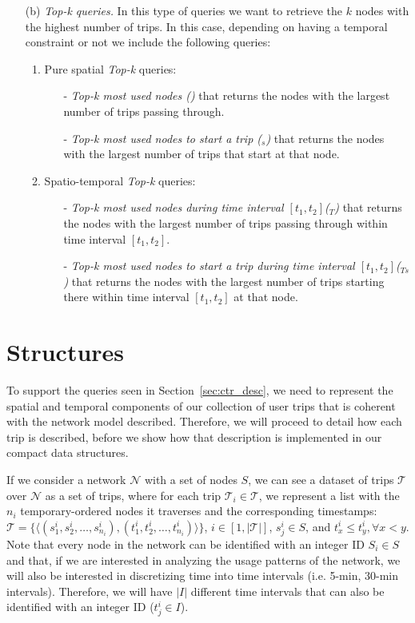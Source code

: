 \begin{itemize}
		\item[(b)] {\em Top-k queries.} In this type of queries we want to retrieve the $k$ nodes with the highest number of trips. In this case, depending on having a temporal constraint or not we include the following queries:
		\begin{enumerate}
			\item Pure spatial {\em Top-k} queries:
			\begin{itemize}
				\item[-] {\em Top-k most used nodes (\topK)} that returns the nodes with the largest number of trips passing through.
				\item[-] {\em Top-k most used nodes to start a trip (\topK$_s$)} that returns the nodes with the largest number of trips that start at that node.
			\end{itemize}
			
			\item Spatio-temporal {\em Top-k}  queries:
			\begin{itemize}
				\item[-] {\em Top-k most used nodes during time interval $[t_1,t_2]$(\topK$_T$)} that returns the nodes with the largest number of trips passing through within time interval $[t_1,t_2]$. 
				\item[-] {\em Top-k most used nodes to start a trip during time interval $[t_1,t_2]$(\topK$_{Ts}$)} that returns the nodes with the largest number of trips starting there within time interval $[t_1,t_2]$ at that node.
			\end{itemize}
		\end{enumerate}
	\end{itemize}

\section{Structures}
\label{sec:ctr_str}
	To support the queries seen in Section~\ref{sec:ctr_desc}, we need to represent the spatial and temporal components of our collection of user trips that is coherent with the network model described. Therefore, we will proceed to detail how each trip is described, before we show how that description is implemented in our compact data structures.

	If we consider a network $\mathcal{N}$ with a set of nodes $S$, 
	we can see a dataset of trips $\mathcal{T}$ over $\mathcal{N}$ as 
	a set of trips, where for each trip $\mathcal{T}_i \in \mathcal{T}$, we represent a list with the 
	$n_i$
	temporary-ordered nodes it traverses and the corresponding timestamps: 
	$\mathcal{T}= \{ \langle (s^i_1, s^i_2, \dots,  s^i_{n_i}),(t^i_1, t^i_2, \dots,  t^i_{n_i}) \rangle\}$, $i\in[1,|\mathcal{T}|]$, 
	$s^i_j \in S$, and $t^i_{x} \leq t^i_y, \forall x < y$. 
	Note that every node in the network can be identified with an integer ID $S_i \in S$ and that, if we are interested in
	analyzing the usage patterns of the network, we will also be interested in discretizing time into 
	time intervals (i.e. 5-min, 30-min intervals). Therefore,
	we will have $|I|$ different time intervals that can also be identified with an
	integer ID ($t^i_j \in I$).

